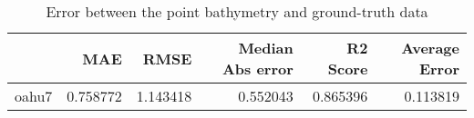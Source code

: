 \begin{table}[h!]
\caption{Error between the point bathymetry and ground-truth data}
\label{tab:oahu7_lidar_error}
\begin{tabular}{lrrrrr}
\toprule
 & MAE & RMSE & Median Abs error & R2 Score & Average Error \\
\midrule
oahu7 & 0.758772 & 1.143418 & 0.552043 & 0.865396 & 0.113819 \\
\bottomrule
\end{tabular}
\end{table}
